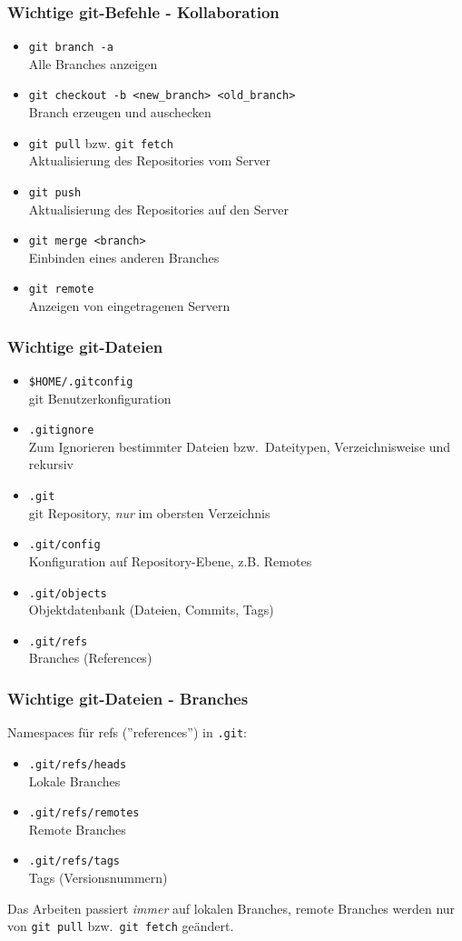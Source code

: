 \begin{frame}
  \frametitle{Wichtige git-Befehle - Kollaboration}
  \begin{itemize}
    \item {\tt git branch -a} \\ Alle Branches anzeigen
    \item {\tt git checkout -b <new\_branch> <old\_branch>} \\ Branch erzeugen und auschecken
    \item {\tt git pull} bzw. {\tt git fetch} \\ Aktualisierung des Repositories vom Server
    \item {\tt git push} \\ Aktualisierung des Repositories auf den Server
    \item {\tt git merge <branch>} \\ Einbinden eines anderen Branches
    \item {\tt git remote} \\ Anzeigen von eingetragenen Servern
  \end{itemize}
\end{frame}

\begin{frame}
  \frametitle{Wichtige git-Dateien}
  \begin{itemize}
    \item {\tt \$HOME/.gitconfig} \\ git Benutzerkonfiguration 
    \item {\tt .gitignore} \\ Zum Ignorieren bestimmter Dateien bzw.\ Dateitypen, Verzeichnisweise und rekursiv
    \item {\tt .git} \\ git Repository, \emph{nur} im obersten Verzeichnis
    \item {\tt .git/config} \\ Konfiguration auf Repository-Ebene, z.B. Remotes
    \item {\tt .git/objects} \\ Objektdatenbank (Dateien, Commits, Tags)
    \item {\tt .git/refs} \\ Branches (References)
  \end{itemize}
\end{frame}

\begin{frame}
  \frametitle{Wichtige git-Dateien - Branches}
  Namespaces für refs (''references'') in {\tt .git}:
  \begin{itemize}
    \item {\tt .git/refs/heads} \\ Lokale Branches
    \item {\tt .git/refs/remotes} \\ Remote Branches
    \item {\tt .git/refs/tags} \\ Tags (Versionsnummern)
  \end{itemize}
  Das Arbeiten passiert \emph{immer} auf lokalen Branches, remote Branches werden nur von {\tt git pull} bzw.\ {\tt git fetch} geändert.
\end{frame}

